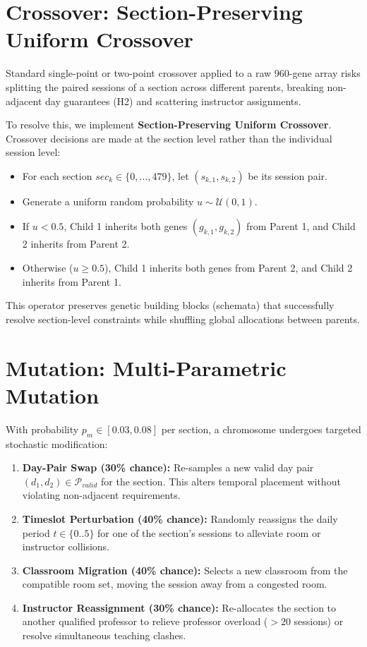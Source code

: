\documentclass[12pt,a4paper]{report}
\begin{document}
\section{Crossover: Section-Preserving Uniform Crossover}
Standard single-point or two-point crossover applied to a raw 960-gene array risks splitting the paired sessions of a section across different parents, breaking non-adjacent day guarantees (H2) and scattering instructor assignments.

To resolve this, we implement \textbf{Section-Preserving Uniform Crossover}. Crossover decisions are made at the section level rather than the individual session level:
\begin{itemize}[leftmargin=1.5em]
  \item For each section $sec_k \in \{0, \dots, 479\}$, let $(s_{k, 1}, s_{k, 2})$ be its session pair.
  \item Generate a uniform random probability $u \sim \mathcal{U}(0, 1)$.
  \item If $u < 0.5$, Child 1 inherits both genes $(g_{k, 1}, g_{k, 2})$ from Parent 1, and Child 2 inherits from Parent 2.
  \item Otherwise ($u \ge 0.5$), Child 1 inherits both genes from Parent 2, and Child 2 inherits from Parent 1.
\end{itemize}
This operator preserves genetic building blocks (schemata) that successfully resolve section-level constraints while shuffling global allocations between parents.

\section{Mutation: Multi-Parametric Mutation}
With probability $p_m \in [0.03, 0.08]$ per section, a chromosome undergoes targeted stochastic modification:
\begin{enumerate}[leftmargin=1.5em]
  \item \textbf{Day-Pair Swap (30\% chance):} Re-samples a new valid day pair $(d_1, d_2) \in \mathcal{P}_{valid}$ for the section. This alters temporal placement without violating non-adjacent requirements.
  \item \textbf{Timeslot Perturbation (40\% chance):} Randomly reassigns the daily period $t \in \{0..5\}$ for one of the section's sessions to alleviate room or instructor collisions.
  \item \textbf{Classroom Migration (40\% chance):} Selects a new classroom from the compatible room set, moving the session away from a congested room.
  \item \textbf{Instructor Reassignment (30\% chance):} Re-allocates the section to another qualified professor to relieve professor overload ($>20$ sessions) or resolve simultaneous teaching clashes.
\end{enumerate}
\end{document}
